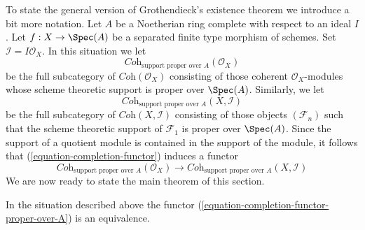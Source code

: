 \noindent
To state the general version of Grothendieck's existence theorem
we introduce a bit more notation. Let $A$ be a Noetherian ring
complete with respect to an ideal $I$. Let $f : X \to \Spec(A)$
be a separated finite type morphism of schemes. Set
$\mathcal{I} = I\mathcal{O}_X$. In this situation we let
$$
\textit{Coh}_{\text{support proper over } A}(\mathcal{O}_X)
$$
be the full subcategory of $\textit{Coh}(\mathcal{O}_X)$
consisting of those coherent $\mathcal{O}_X$-modules whose
scheme theoretic support is proper over $\Spec(A)$.
Similarly, we let
$$
\textit{Coh}_{\text{support proper over } A}(X, \mathcal{I})
$$
be the full subcategory of $\textit{Coh}(X, \mathcal{I})$
consisting of those objects $(\mathcal{F}_n)$ such that
the scheme theoretic support of $\mathcal{F}_1$ is proper over $\Spec(A)$.
Since the support of a quotient module is contained in the support
of the module, it follows that (\ref{equation-completion-functor})
induces a functor
\begin{equation}
\label{equation-completion-functor-proper-over-A}
\textit{Coh}_{\text{support proper over }A}(\mathcal{O}_X)
\longrightarrow
\textit{Coh}_{\text{support proper over }A}(X, \mathcal{I})
\end{equation}
We are now ready to state the main theorem of this section.

\begin{theorem}
\label{theorem-grothendieck-existence}
In the situation described above the functor
(\ref{equation-completion-functor-proper-over-A})
is an equivalence.
\end{theorem}

